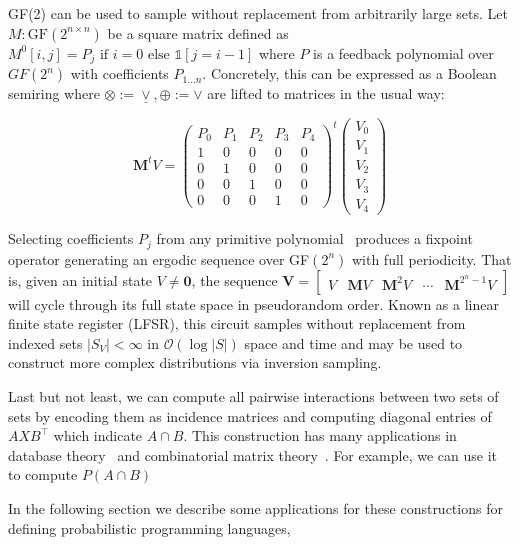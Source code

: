 \documentclass[sigplan,10pt,review,anonymous]{acmart}
\begin{document}
GF(2) can be used to sample without replacement from arbitrarily large sets. Let $M: \text{GF}(2^{n\times n})$ be a square matrix defined as $M^0[i, j] = P_j \text{ if } i=0 \text{ else } \mathds{1}[j = i - 1]$ where $P$ is a feedback polynomial over $GF(2^n)$ with coefficients $P_{1\ldots n}$. Concretely, this can be expressed as a Boolean semiring where $\otimes := \underline{\vee}, \oplus := \vee$ are lifted to matrices in the usual way:

\vspace{-5pt}
\[
\mathbf{M}^tV = \begin{pmatrix}
  P_0 & P_1 & P_2 & P_3 & P_4 \\
  1 & 0 & 0 & 0 & 0 \\
  0 & 1 & 0 & 0 & 0 \\
  0 & 0 & 1 & 0 & 0 \\
  0 & 0 & 0 & 1 & 0
\end{pmatrix}^t
\begin{pmatrix}
      V_0 \\
      V_1 \\
      V_2 \\
      V_3 \\
      V_4
\end{pmatrix}
\]

Selecting coefficients $P_j$ from any primitive polynomial~\citep{saxena2004primitive} produces a fixpoint operator generating an ergodic sequence over GF$(2^n)$ with full periodicity. That is, given an initial state $V \neq \mathbf{0}$, the sequence $\mathbf{V} = \begin{bmatrix}V & \mathbf{M}V & \mathbf{M}^{2}V & \cdots & \mathbf{M}^{2^n-1}V \end{bmatrix}$ will cycle through its full state space in pseudorandom order. Known as a linear finite state register (LFSR), this circuit samples without replacement from indexed sets $|S_V|<\infty$ in $\mathcal{O}(\log |S|)$ space and time and may be used to construct more complex distributions via inversion sampling.

Last but not least, we can compute all pairwise interactions between two sets of sets by encoding them as incidence matrices and computing diagonal entries of $AXB^\intercal$ which indicate $A \cap B$. This construction has many applications in database theory~\citep{deep2020fast} and combinatorial matrix theory~\citep{brualdi1991combinatorial}. For example, we can use it to compute $P(A \cap B)$

In the following section we describe some applications for these constructions for defining probabilistic programming languages,
\end{document}
